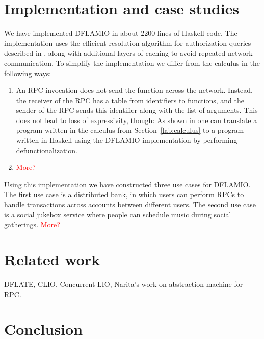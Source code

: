 \documentclass[conference]{IEEEtran}
\begin{document}
\section{Implementation and case studies}
We have implemented DFLAMIO in about 2200 lines of Haskell code. The implementation uses the efficient resolution algorithm for authorization queries described in \cite{Arden:2015:FA:2859845.2859998}, along with additional layers of caching to avoid repeated network communication. To simplify the implementation we differ from the calculus in the following ways:
\begin{enumerate}
    \item An RPC invocation does not send the function across the network. Instead, the receiver of the RPC has a table from identifiers to functions, and the sender of the RPC sends this identifier along with the list of arguments. This does not lead to loss of expressivity, though: As shown in \cite{Cooper:2009:RC:1599410.1599439} one can translate a program written in the calculus from Section~\ref{lab:calculus} to a program written in Haskell using the DFLAMIO implementation by performing defunctionalization.
    \item \textcolor{red}{More?}
\end{enumerate}
Using this implementation we have constructed three use cases for DFLAMIO. The first use case is a distributed bank, in which users can perform RPCs to handle transactions across accounts between different users. The second use case is a social jukebox service \cite{Lots of citations} where people can schedule music during social gatherings. \textcolor{red}{More?}

\section{Related work}
DFLATE, CLIO, Concurrent LIO, Narita's work on abstraction machine for RPC.

\section{Conclusion}




\vspace{12pt}
\end{document}
